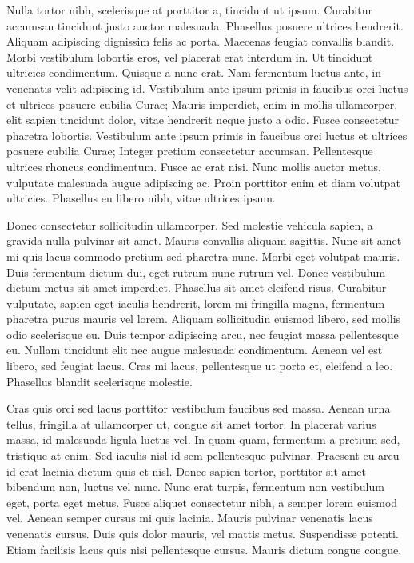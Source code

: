 Nulla tortor nibh, scelerisque at porttitor a, tincidunt ut ipsum.
Curabitur accumsan tincidunt justo auctor malesuada.
Phasellus posuere ultrices hendrerit.
Aliquam adipiscing dignissim felis ac porta.
Maecenas feugiat convallis blandit.
Morbi vestibulum lobortis eros, vel placerat erat interdum in.
Ut tincidunt ultricies condimentum.
Quisque a nunc erat.
Nam fermentum luctus ante, in venenatis velit adipiscing id.
Vestibulum ante ipsum primis in faucibus orci luctus et ultrices posuere cubilia Curae; Mauris imperdiet, enim in mollis ullamcorper, elit sapien tincidunt dolor, vitae hendrerit neque justo a odio.
Fusce consectetur pharetra lobortis.
Vestibulum ante ipsum primis in faucibus orci luctus et ultrices posuere cubilia Curae; Integer pretium consectetur accumsan.
Pellentesque ultrices rhoncus condimentum.
Fusce ac erat nisi.
Nunc mollis auctor metus, vulputate malesuada augue adipiscing ac.
Proin porttitor enim et diam volutpat ultricies.
Phasellus eu libero nibh, vitae ultrices ipsum.

Donec consectetur sollicitudin ullamcorper.
Sed molestie vehicula sapien, a gravida nulla pulvinar sit amet.
Mauris convallis aliquam sagittis.
Nunc sit amet mi quis lacus commodo pretium sed pharetra nunc.
Morbi eget volutpat mauris.
Duis fermentum dictum dui, eget rutrum nunc rutrum vel.
Donec vestibulum dictum metus sit amet imperdiet.
Phasellus sit amet eleifend risus.
Curabitur vulputate, sapien eget iaculis hendrerit, lorem mi fringilla magna, fermentum pharetra purus mauris vel lorem.
Aliquam sollicitudin euismod libero, sed mollis odio scelerisque eu.
Duis tempor adipiscing arcu, nec feugiat massa pellentesque eu.
Nullam tincidunt elit nec augue malesuada condimentum.
Aenean vel est libero, sed feugiat lacus.
Cras mi lacus, pellentesque ut porta et, eleifend a leo.
Phasellus blandit scelerisque molestie.

Cras quis orci sed lacus porttitor vestibulum faucibus sed massa.
Aenean urna tellus, fringilla at ullamcorper ut, congue sit amet tortor.
In placerat varius massa, id malesuada ligula luctus vel.
In quam quam, fermentum a pretium sed, tristique at enim.
Sed iaculis nisl id sem pellentesque pulvinar.
Praesent eu arcu id erat lacinia dictum quis et nisl.
Donec sapien tortor, porttitor sit amet bibendum non, luctus vel nunc.
Nunc erat turpis, fermentum non vestibulum eget, porta eget metus.
Fusce aliquet consectetur nibh, a semper lorem euismod vel.
Aenean semper cursus mi quis lacinia.
Mauris pulvinar venenatis lacus venenatis cursus.
Duis quis dolor mauris, vel mattis metus.
Suspendisse potenti.
Etiam facilisis lacus quis nisi pellentesque cursus.
Mauris dictum congue congue.

